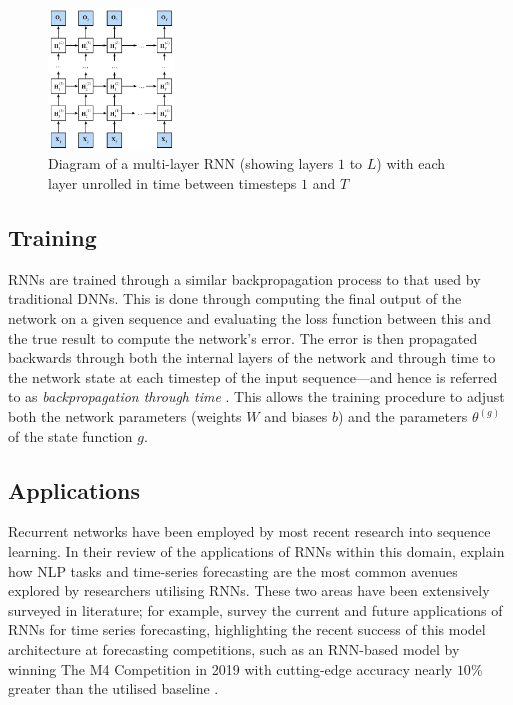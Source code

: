 \documentclass[a4paper, 11pt]{report}
\begin{document}
    \begin{figure}[ht]
        \centering
        \includegraphics[width=0.3\textwidth]{deep-rnn.png}
        \caption{\centering Diagram of a multi-layer RNN (showing layers $1$ to $L$) with each layer unrolled in time between timesteps $1$ and $T$ \citep{zhang-2021}}
        \label{fig: deep-rnn}
    \end{figure}


    \subsection{Training}

    RNNs are trained through a similar backpropagation process to that used by traditional DNNs. This is done through computing the final output of the network on a given sequence and evaluating the loss function between this and the true result to compute the network's error. The error is then propagated backwards through both the internal layers of the network and through time to the network state at each timestep of the input sequence---and hence is referred to as \emph{backpropagation through time} \citep{zhang-2021}. This allows the training procedure to adjust both the network parameters (weights $W$ and biases $b$) and the parameters $\theta^{(g)}$ of the state function $g$.


    \subsection{Applications}

    Recurrent networks have been employed by most recent research into sequence learning. In their review of the applications of RNNs within this domain, \citet{lipton-2015} explain how NLP tasks and time-series forecasting are the most common avenues explored by researchers utilising RNNs. These two areas have been extensively surveyed in literature; for example, \citet{hewamalage-2021} survey the current and future applications of RNNs for time series forecasting, highlighting the recent success of this model architecture at forecasting competitions, such as an RNN-based model by \citet{smyl-2020} winning The M4 Competition in 2019 with cutting-edge accuracy nearly $10\%$ greater than the utilised baseline \citep{makridakis-2020}.
\end{document}
